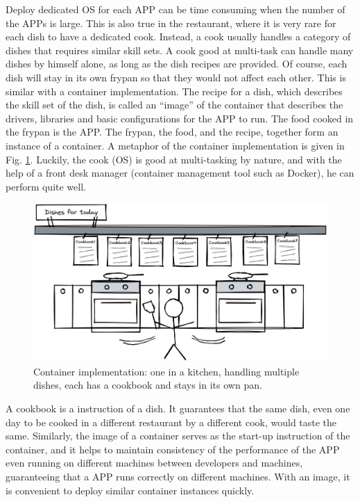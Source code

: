 Deploy dedicated OS for each APP can be time consuming when the number of the APPs is large. This is also true in the restaurant, where it is very rare for each dish to have a dedicated cook. Instead, a cook usually handles a category of dishes that requires similar skill sets. A cook good at multi-task can handle many dishes by himself alone, as long as the dish recipes are provided. Of course, each dish will stay in its own frypan so that they would not affect each other. This is similar with a container implementation. The recipe for a dish, which describes the skill set of the dish, is called an ``image'' of the container that describes the drivers, libraries and basic configurations for the APP to run. The food cooked in the frypan is the APP. The frypan, the food, and the recipe, together form an instance of a container. A metaphor of the container implementation is given in Fig. \ref{chvirtualizationandcontainerization:fig:multitaskcook}. Luckily, the cook (OS) is good at multi-tasking by nature, and with the help of a front desk manager (container management tool such as Docker), he can perform quite well.
\begin{figure}
	\centering
	\includegraphics[width=350pt]{chapters/ch_virtualization_and_containerization/figures/multitaskcook.png}
	\caption{Container implementation: one in a kitchen, handling multiple dishes, each has a cookbook and stays in its own pan.} \label{chvirtualizationandcontainerization:fig:multitaskcook}
\end{figure}

A cookbook is a instruction of a dish. It guarantees that the same dish, even one day to be cooked in a different restaurant by a different cook, would taste the same. Similarly, the image of a container serves as the start-up instruction of the container, and it helps to maintain consistency of the performance of the APP even running on different machines between developers and machines, guaranteeing that a APP runs correctly on different machines. With an image, it is convenient to deploy similar container instances quickly.

